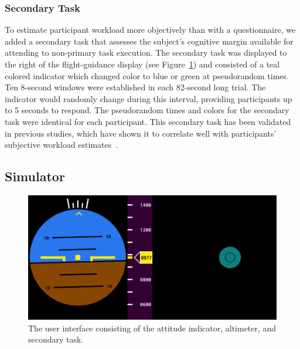 \subsubsection{Secondary Task}
To estimate participant workload more objectively than with a questionnaire, we added a secondary task that assesses the subject's cognitive margin available for attending to non-primary task execution.
The secondary task was displayed to the right of the flight-guidance display (see Figure~\ref{figure-hfes:userinterface}) and consisted of a teal colored indicator which changed color to blue or green at pseudorandom times.
Ten 8-second windows were established in each 82-second long trial.
The indicator would randomly change during this interval, providing participants up to 5 seconds to respond.
The pseudorandom times and colors for the secondary task were identical for each participant.
This secondary task has been validated in previous studies, which have shown it to correlate well with participants' subjective workload estimates~\citep{hainley_pilot_2013}.

\subsection{Simulator}
\begin{figure}[b!]
    \begin{center}
        \includegraphics[width=0.8\linewidth]{figures/Aircraft/image1.png}
        \caption[The user interface]{The user interface consisting of the attitude indicator, altimeter, and secondary task.}
        \label{figure-hfes:userinterface}
    \end{center}
\end{figure}

